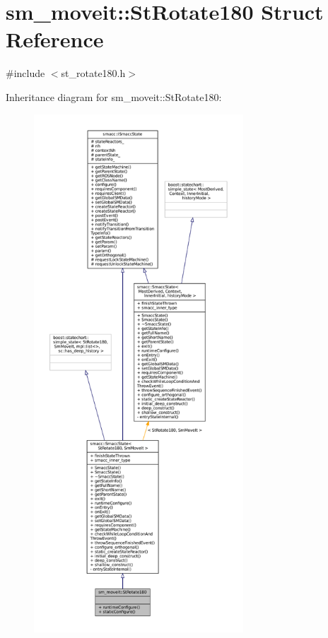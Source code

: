 \hypertarget{structsm__moveit_1_1StRotate180}{}\section{sm\+\_\+moveit\+:\+:St\+Rotate180 Struct Reference}
\label{structsm__moveit_1_1StRotate180}


{\ttfamily \#include $<$st\+\_\+rotate180.\+h$>$}



Inheritance diagram for sm\+\_\+moveit\+:\+:St\+Rotate180\+:
\nopagebreak
\begin{figure}[H]
\begin{center}
\leavevmode
\includegraphics[height=550pt]{structsm__moveit_1_1StRotate180__inherit__graph}
\end{center}
\end{figure}


